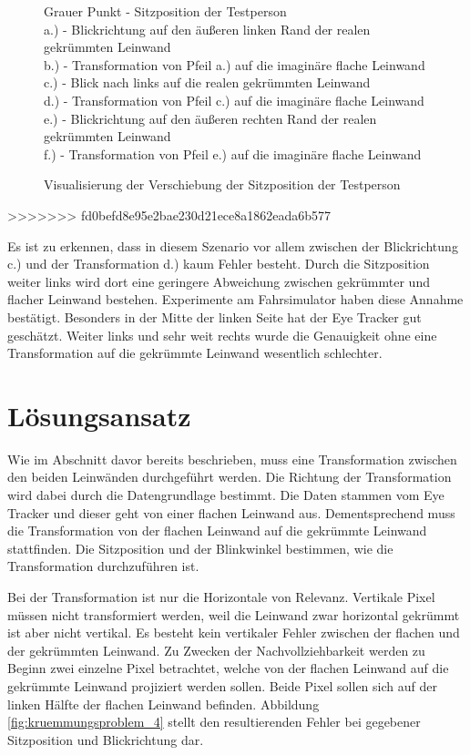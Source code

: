 \begin{figure}
\begin{center}
\begin{tikzpicture}
		\end{tikzpicture}
		\caption[]{Visualisierung der Verschiebung der Sitzposition der Testperson}
		\captionsetup{justification=justified, singlelinecheck=false}
		{\footnotesize Grauer Punkt - Sitzposition der Testperson\\
		a.) - Blickrichtung auf den äußeren linken Rand der realen gekrümmten Leinwand\\
		b.) - Transformation von Pfeil a.) auf die imaginäre flache Leinwand\\
		c.) - Blick nach links auf die realen gekrümmten Leinwand\\
		d.) - Transformation von Pfeil c.) auf die imaginäre flache Leinwand\\
		e.) - Blickrichtung auf den äußeren rechten Rand der realen gekrümmten Leinwand\\
		f.) - Transformation von Pfeil e.) auf die imaginäre flache Leinwand} \label{fig:kruemmungsproblem_3}
	\end{center}
\end{figure}
>>>>>>> fd0befd8e95e2bae230d21ece8a1862eada6b577

Es ist zu erkennen, dass in diesem Szenario vor allem zwischen der Blickrichtung c.) und der Transformation d.) kaum Fehler besteht. Durch die Sitzposition weiter links wird dort eine geringere Abweichung zwischen gekrümmter und flacher Leinwand bestehen. Experimente am Fahrsimulator haben diese Annahme bestätigt. Besonders in der Mitte der linken Seite hat der Eye Tracker gut geschätzt. Weiter links und sehr weit rechts wurde die Genauigkeit ohne eine Transformation auf die gekrümmte Leinwand wesentlich schlechter. 



\section{Lösungsansatz}

Wie im Abschnitt davor bereits beschrieben, muss eine Transformation zwischen den beiden Leinwänden durchgeführt werden. Die Richtung der Transformation wird dabei durch die Datengrundlage bestimmt. Die Daten stammen vom Eye Tracker und dieser geht von einer flachen Leinwand aus. Dementsprechend muss die Transformation von der flachen Leinwand auf die gekrümmte Leinwand stattfinden. 
Die Sitzposition und der Blinkwinkel bestimmen, wie die Transformation durchzuführen ist. 

Bei der Transformation ist nur die Horizontale von Relevanz. Vertikale \Gls{Pixel} müssen nicht transformiert werden, weil die Leinwand zwar horizontal gekrümmt ist aber nicht vertikal. Es besteht kein vertikaler Fehler zwischen der flachen und der gekrümmten Leinwand. Zu Zwecken der Nachvollziehbarkeit werden zu Beginn zwei einzelne Pixel betrachtet, welche von der flachen Leinwand auf die gekrümmte Leinwand projiziert werden sollen. Beide Pixel sollen sich auf der linken Hälfte der flachen Leinwand befinden. Abbildung \ref{fig:kruemmungsproblem_4} stellt den resultierenden Fehler bei gegebener Sitzposition und Blickrichtung dar. 



